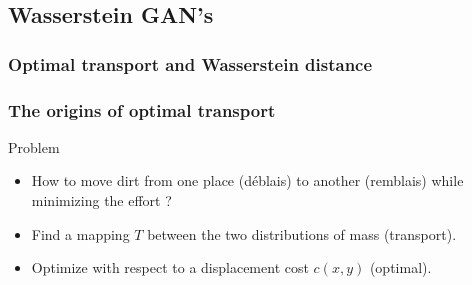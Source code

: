 \documentclass[french,9pt]{beamer}
\begin{document}

\subsection{Wasserstein GAN's}

\subsubsection{Optimal transport and Wasserstein distance}

\begin{frame}
\frametitle{The origins of optimal transport}

\begin{center}
\end{center}

\begin{block}{Problem}
\begin{itemize}
\item How to move dirt from one place (déblais) to another (remblais) while minimizing the effort ?
\item Find a mapping $T$ between the two distributions of mass (transport).
\item Optimize with respect to a displacement cost $c(x,y)$ (optimal).
\end{itemize}
\end{block}


\end{frame}
\end{document}
